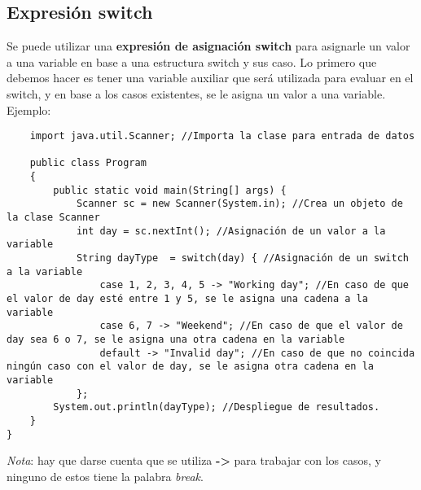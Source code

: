 \subsection{Expresión switch}
Se puede utilizar una \textbf{expresión de asignación switch} para asignarle un valor a una variable en base a una estructura switch y sus caso. Lo primero que debemos hacer es tener una variable auxiliar que será utilizada para evaluar en el switch, y en base a los casos existentes, se le asigna un valor a una variable. Ejemplo:
\begin{lstlisting}
    import java.util.Scanner; //Importa la clase para entrada de datos
    
    public class Program
    {
        public static void main(String[] args) {
            Scanner sc = new Scanner(System.in); //Crea un objeto de la clase Scanner
            int day = sc.nextInt(); //Asignación de un valor a la variable
            String dayType  = switch(day) { //Asignación de un switch a la variable
                case 1, 2, 3, 4, 5 -> "Working day"; //En caso de que el valor de day esté entre 1 y 5, se le asigna una cadena a la variable
                case 6, 7 -> "Weekend"; //En caso de que el valor de day sea 6 o 7, se le asigna una otra cadena en la variable
                default -> "Invalid day"; //En caso de que no coincida ningún caso con el valor de day, se le asigna otra cadena en la variable
            };
        System.out.println(dayType); //Despliegue de resultados.
    }
} 
\end{lstlisting}
\textit{Nota}: hay que darse cuenta que se utiliza \textbf{->} para trabajar con los casos, y ninguno de estos tiene la palabra \textit{break}.